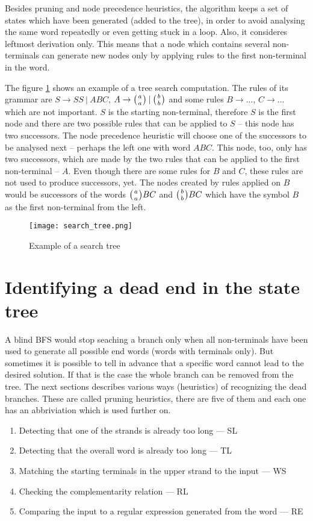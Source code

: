 Besides pruning and node precedence heuristics, the algorithm keeps a set of states which have been generated (added to the tree), in order to avoid analysing the same word repeatedly or even getting stuck in a loop. Also, it consideres leftmost derivation only. This means that a node which contains several non-terminals can generate new nodes only by applying rules to the first non-terminal in the word.

The figure \ref{fig:search_tree} shows an example of a tree search computation. The rules of its grammar are $S \rightarrow S S \:|\: A B C$, $A \rightarrow \wkpair{a}{a} \:|\: \wkpair{b}{b}$ and some rules $B \rightarrow ...$, $C \rightarrow ...$ which are not important. $S$ is the starting non-terminal, therefore $S$ is the first node and there are two possible rules that can be applied to $S$ -- this node has two successors. The node precedence heuristic will choose one of the successors to be analysed next -- perhaps the left one with word $A B C$. This node, too, only has two successors, which are made by the two rules that can be applied to the first non-terminal -- $A$. Even though there are some rules for $B$ and $C$, these rules are not used to produce successors, yet. The nodes created by rules applied on $B$ would be successors of the words $\wkpair{a}{a} B C$ and $\wkpair{b}{b} B C$ which have the symbol $B$ as the first non-terminal from the left.

\begin{figure}[h]
  \centering
  \texttt{[image: search\_tree.png]}
  \caption{Example of a search tree}
  \label{fig:search_tree}
\end{figure}


\section{Identifying a dead end in the state tree}
A blind BFS would stop seaching a branch only when all non-terminals have been used to generate all possible end words (words with terminals only). But sometimes it is possible to tell in advance that a specific word cannot lead to the desired solution. If that is the case the whole branch can be removed from the tree. The next sections describes various ways (heuristics) of recognizing the dead branches. These are called pruning heuristics, there are five of them and each one has an abbriviation which is used further on.

\begin{enumerate}
  \item{Detecting that one of the strands is already too long --- SL}
  \item{Detecting that the overall word is already too long --- TL}
  \item{Matching the starting terminals in the upper strand to the input --- WS}
  \item{Checking the complementarity relation --- RL}
  \item{Comparing the input to a regular expression generated from the word --- RE}
\end{enumerate}


